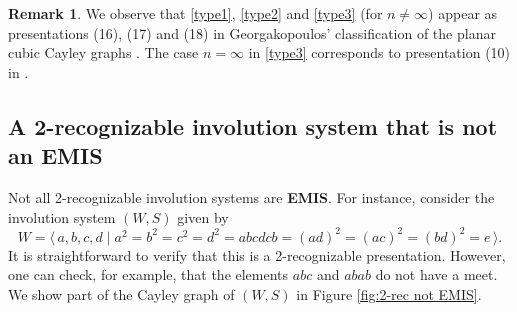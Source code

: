 \documentclass[A4paper, oneside]{amsart}
\newcommand{\mpair}[1]{\langle\, #1\,\rangle}  %
\newcommand{\EMIS}{\textnormal{\bf EMIS}\xspace}
\theoremstyle{definition}
\newtheorem{rem}[thm]{Remark}
\begin{document}
  \begin{rem}     
     We observe that \ref{type1}, \ref{type2} and \ref{type3} (for $n \neq \infty$) appear as presentations (16), (17) and (18) in Georgakopoulos' classification of the planar cubic Cayley graphs \cite{cubicplanar}. The case $n = \infty$ in \ref{type3} corresponds to presentation (10) in \cite{cubicplanar}.
 \end{rem}




\subsection{A 2-recognizable involution system that is not an \EMIS} 
\label{sec: 2-rec not EMIS}
 Not all 2-recognizable involution systems are \EMIS. For instance, consider the involution system $(W,S)$ given by
 \begin{equation} \label{eq: 2-rec not EMIS}
 	W = \mpair{a,b,c,d \mid a^2=b^2=c^2=d^2=abcdcb=(ad)^2=(ac)^2=(bd)^2=e}.
 \end{equation}
 It is straightforward to verify that this is a 2-recognizable presentation. However, one can check, for example, that the elements $abc$ and $abab$ do not have a meet. We show part of the Cayley graph of $(W,S)$ in Figure \ref{fig:2-rec not EMIS}.
\end{document}
